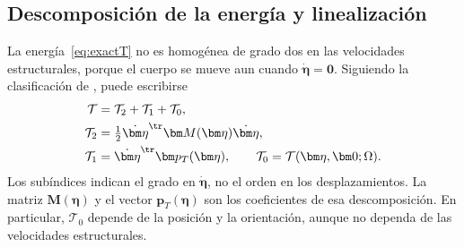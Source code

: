 \subsection{Descomposición de la energía y linealización}
La energía~\eqref{eq:exactT} no es homogénea de grado dos en las velocidades estructurales, porque el cuerpo se mueve aun cuando $\dot{\bm\eta}=\bm0$. Siguiendo la clasificación de \citet[secciones 4.1 y 4.4]{meirovitch1997}, puede escribirse
\begin{align}
\mathcal T&=\mathcal T_2+\mathcal T_1+\mathcal T_0,\nonumber\\
\mathcal T_2&=\tfrac12\dot{\bm\eta}^\tr\bm M(\bm\eta)\dot{\bm\eta},\nonumber\\
\mathcal T_1&=\dot{\bm\eta}^\tr\bm p_T(\bm\eta),\qquad
\mathcal T_0=\mathcal T(\bm\eta,\bm0;\Omega).
\label{eq:descomposicion}
\end{align}
Los subíndices indican el grado en $\dot{\bm\eta}$, no el orden en los desplazamientos. La matriz $\bm M(\bm\eta)$ y el vector $\bm p_T(\bm\eta)$ son los coeficientes de esa descomposición. En particular, $\mathcal T_0$ depende de la posición y la orientación, aunque no dependa de las velocidades estructurales.

